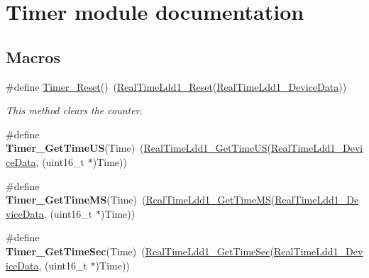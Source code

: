 \hypertarget{group___timer__module}{\section{Timer module documentation}
\label{group___timer__module}
}
\subsection*{Macros}
\begin{DoxyCompactItemize}
\item 
\#define \hyperlink{group___timer__module_gab3adb07768e961b0ace67e1f1b2d1815}{Timer\-\_\-\-Reset}()~(\hyperlink{group___real_time_ldd1__module_ga0ab12085af54faedfa91a478fa2503fb}{Real\-Time\-Ldd1\-\_\-\-Reset}(\hyperlink{group___real_time_ldd1__module_gacfe72af829146d3851fed2d4c9279d1a}{Real\-Time\-Ldd1\-\_\-\-Device\-Data}))
\begin{DoxyCompactList}\small\item\em This method clears the counter. \end{DoxyCompactList}\item 
\hypertarget{group___timer__module_ga396f681759260ef7cf55f42146177604}{\#define {\bfseries Timer\-\_\-\-Get\-Time\-U\-S}(Time)~(\hyperlink{group___real_time_ldd1__module_ga39a45f1663f1d6d416b5d81f845af8b9}{Real\-Time\-Ldd1\-\_\-\-Get\-Time\-U\-S}(\hyperlink{group___real_time_ldd1__module_gacfe72af829146d3851fed2d4c9279d1a}{Real\-Time\-Ldd1\-\_\-\-Device\-Data}, (uint16\-\_\-t $\ast$)Time))}\label{group___timer__module_ga396f681759260ef7cf55f42146177604}

\item 
\hypertarget{group___timer__module_gae5df31715195ea128b83b4182581d911}{\#define {\bfseries Timer\-\_\-\-Get\-Time\-M\-S}(Time)~(\hyperlink{group___real_time_ldd1__module_ga1b5875d7a8eea98aff85f9b009d1b8a2}{Real\-Time\-Ldd1\-\_\-\-Get\-Time\-M\-S}(\hyperlink{group___real_time_ldd1__module_gacfe72af829146d3851fed2d4c9279d1a}{Real\-Time\-Ldd1\-\_\-\-Device\-Data}, (uint16\-\_\-t $\ast$)Time))}\label{group___timer__module_gae5df31715195ea128b83b4182581d911}

\item 
\hypertarget{group___timer__module_ga7169415c3a92e84446e29afb9f1737b8}{\#define {\bfseries Timer\-\_\-\-Get\-Time\-Sec}(Time)~(\hyperlink{group___real_time_ldd1__module_ga4ef5eebdd8e35716a31357eeadffe902}{Real\-Time\-Ldd1\-\_\-\-Get\-Time\-Sec}(\hyperlink{group___real_time_ldd1__module_gacfe72af829146d3851fed2d4c9279d1a}{Real\-Time\-Ldd1\-\_\-\-Device\-Data}, (uint16\-\_\-t $\ast$)Time))}\label{group___timer__module_ga7169415c3a92e84446e29afb9f1737b8}

\end{DoxyCompactItemize}


